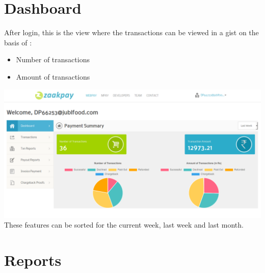\documentclass{article}
\begin{document}
\section{Dashboard}

After login, this is the view where the transactions can be viewed in a gist on the basis of :
\begin{itemize}
\item Number of transactions
\item Amount of transactions
\end{itemize}


\includegraphics[width=6.5 in,height=3.4 in]{Dashboard_home.png}
\\
These features can be sorted for the current week, last week and last month.
\newpage
\section{Reports}
\end{document}
